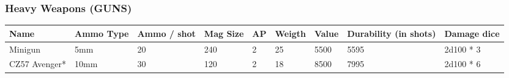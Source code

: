 
\subsubsection{Heavy Weapons (GUNS)}
\begin{longtable}{|p{3.2cm}|p{2.4cm}|p{1.3cm}|p{.9cm}|p{0.6cm}|p{1.3cm}|p{1cm}|p{2cm}|p{3.2cm}|}
\hline
\bfseries Name & \bfseries Ammo Type & \bfseries Ammo / shot & \bfseries Mag Size & \bfseries AP & \bfseries Weigth & \bfseries Value & \bfseries Durability (in shots) & \bfseries Damage dice \\
\hline
Minigun & 5mm & 20 & 240 & 2 & 25 & 5500 & 5595 & 2d100 * 3 \\
CZ57 Avenger* & 10mm & 30 & 120 & 2 & 18 & 8500 & 7995 & 2d100 * 6 \\
\hline
\end{longtable}
